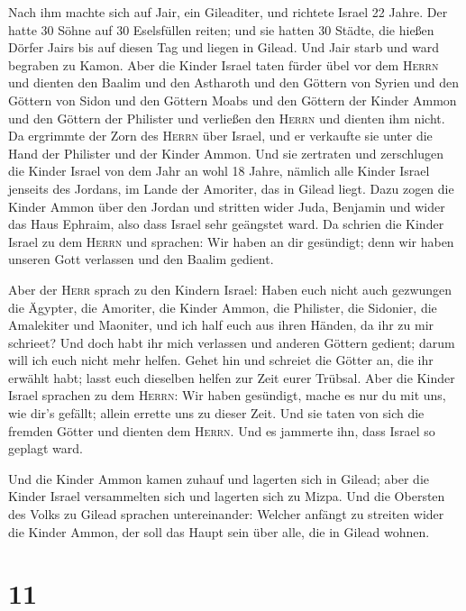  Nach ihm machte sich auf Jair, ein Gileaditer, und
richtete Israel 22 Jahre.  Der hatte 30 Söhne auf 30
Eselsfüllen reiten; und sie hatten 30 Städte, die hießen Dörfer Jairs
bis auf diesen Tag und liegen in Gilead.  Und Jair starb
und ward begraben zu Kamon.  Aber die Kinder Israel taten
fürder übel vor dem \textsc{Herrn} und dienten den Baalim und den
Astharoth und den Göttern von Syrien und den Göttern von Sidon und den
Göttern Moabs und den Göttern der Kinder Ammon und den Göttern der
Philister und verließen den \textsc{Herrn} und dienten ihm nicht.
 Da ergrimmte der Zorn des \textsc{Herrn} über Israel, und
er verkaufte sie unter die Hand der Philister und der Kinder Ammon.
 Und sie zertraten und zerschlugen die Kinder Israel von
dem Jahr an wohl 18 Jahre, nämlich alle Kinder Israel jenseits des
Jordans, im Lande der Amoriter, das in Gilead liegt.  Dazu
zogen die Kinder Ammon über den Jordan und stritten wider Juda, Benjamin
und wider das Haus Ephraim, also dass Israel sehr geängstet ward.
 Da schrien die Kinder Israel zu dem \textsc{Herrn} und
sprachen: Wir haben an dir gesündigt; denn wir haben unseren Gott
verlassen und den Baalim gedient.

 Aber der \textsc{Herr} sprach zu den Kindern Israel:
Haben euch nicht auch gezwungen die Ägypter, die Amoriter, die Kinder
Ammon, die Philister,  die Sidonier, die Amalekiter und
Maoniter, und ich half euch aus ihren Händen, da ihr zu mir schrieet?
 Und doch habt ihr mich verlassen und anderen Göttern
gedient; darum will ich euch nicht mehr helfen.  Gehet
hin und schreiet die Götter an, die ihr erwählt habt; lasst euch
dieselben helfen zur Zeit eurer Trübsal.  Aber die Kinder
Israel sprachen zu dem \textsc{Herrn}: Wir haben gesündigt, mache es nur
du mit uns, wie dir's gefällt; allein errette uns zu dieser Zeit.
 Und sie taten von sich die fremden Götter und dienten
dem \textsc{Herrn}. Und es jammerte ihn, dass Israel so geplagt ward.

 Und die Kinder Ammon kamen zuhauf und lagerten sich in
Gilead; aber die Kinder Israel versammelten sich und lagerten sich zu
Mizpa.  Und die Obersten des Volks zu Gilead sprachen
untereinander: Welcher anfängt zu streiten wider die Kinder Ammon, der
soll das Haupt sein über alle, die in Gilead wohnen.

\hypertarget{section-10}{%
\section{11}\label{section-10}}


